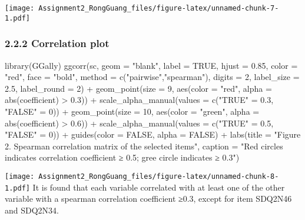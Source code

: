 \documentclass[
]{article}
\newenvironment{Shaded}{\begin{snugshade}}{\end{snugshade}}
\newcommand{\AttributeTok}[1]{\textcolor[rgb]{0.77,0.63,0.00}{#1}}
\newcommand{\ConstantTok}[1]{\textcolor[rgb]{0.00,0.00,0.00}{#1}}
\newcommand{\DecValTok}[1]{\textcolor[rgb]{0.00,0.00,0.81}{#1}}
\newcommand{\FloatTok}[1]{\textcolor[rgb]{0.00,0.00,0.81}{#1}}
\newcommand{\FunctionTok}[1]{\textcolor[rgb]{0.00,0.00,0.00}{#1}}
\newcommand{\NormalTok}[1]{#1}
\newcommand{\OtherTok}[1]{\textcolor[rgb]{0.56,0.35,0.01}{#1}}
\newcommand{\SpecialCharTok}[1]{\textcolor[rgb]{0.00,0.00,0.00}{#1}}
\newcommand{\StringTok}[1]{\textcolor[rgb]{0.31,0.60,0.02}{#1}}
\begin{document}
\texttt{[image: Assignment2\_RongGuang\_files/figure-latex/unnamed-chunk-7-1.pdf]}

\hypertarget{correlation-plot}{%
\subsubsection{2.2.2 Correlation plot}\label{correlation-plot}}

\begin{Shaded}
\begin{Highlighting}[]
\FunctionTok{library}\NormalTok{(GGally)}
\FunctionTok{ggcorr}\NormalTok{(sc, }
       \AttributeTok{geom =} \StringTok{"blank"}\NormalTok{, }
       \AttributeTok{label =} \ConstantTok{TRUE}\NormalTok{, }
       \AttributeTok{hjust =} \FloatTok{0.85}\NormalTok{, }
       \AttributeTok{color =} \StringTok{"red"}\NormalTok{, }
       \AttributeTok{face =} \StringTok{"bold"}\NormalTok{, }
       \AttributeTok{method =} \FunctionTok{c}\NormalTok{(}\StringTok{"pairwise"}\NormalTok{,}\StringTok{"spearman"}\NormalTok{),}
       \AttributeTok{digits =} \DecValTok{2}\NormalTok{,}
       \AttributeTok{label\_size =} \FloatTok{2.5}\NormalTok{,}
       \AttributeTok{label\_round =} \DecValTok{2}\NormalTok{) }\SpecialCharTok{+}
  \FunctionTok{geom\_point}\NormalTok{(}\AttributeTok{size =} \DecValTok{9}\NormalTok{, }
             \FunctionTok{aes}\NormalTok{(}\AttributeTok{color =} \StringTok{"red"}\NormalTok{, }
                 \AttributeTok{alpha =} \FunctionTok{abs}\NormalTok{(coefficient) }\SpecialCharTok{\textgreater{}} \FloatTok{0.3}\NormalTok{)) }\SpecialCharTok{+}
  \FunctionTok{scale\_alpha\_manual}\NormalTok{(}\AttributeTok{values =} \FunctionTok{c}\NormalTok{(}\StringTok{"TRUE"} \OtherTok{=} \FloatTok{0.3}\NormalTok{, }\StringTok{"FALSE"} \OtherTok{=} \DecValTok{0}\NormalTok{)) }\SpecialCharTok{+}
    \FunctionTok{geom\_point}\NormalTok{(}\AttributeTok{size =} \DecValTok{10}\NormalTok{, }
               \FunctionTok{aes}\NormalTok{(}\AttributeTok{color =} \StringTok{"green"}\NormalTok{, }\AttributeTok{alpha =} \FunctionTok{abs}\NormalTok{(coefficient) }\SpecialCharTok{\textgreater{}} \FloatTok{0.6}\NormalTok{)) }\SpecialCharTok{+}
  \FunctionTok{scale\_alpha\_manual}\NormalTok{(}\AttributeTok{values =} \FunctionTok{c}\NormalTok{(}\StringTok{"TRUE"} \OtherTok{=} \FloatTok{0.5}\NormalTok{, }\StringTok{"FALSE"} \OtherTok{=} \DecValTok{0}\NormalTok{)) }\SpecialCharTok{+}
  \FunctionTok{guides}\NormalTok{(}\AttributeTok{color =} \ConstantTok{FALSE}\NormalTok{, }
         \AttributeTok{alpha =} \ConstantTok{FALSE}\NormalTok{) }\SpecialCharTok{+}
  \FunctionTok{labs}\NormalTok{(}\AttributeTok{title =} \StringTok{"Figure 2. Spearman correlation matrix of the selected items"}\NormalTok{,}
       \AttributeTok{caption =} 
         \StringTok{"Red circles indicates correlation coefficient ≥ 0.5; gree circle indicates ≥ 0.3"}\NormalTok{)}
\end{Highlighting}
\end{Shaded}

\texttt{[image: Assignment2\_RongGuang\_files/figure-latex/unnamed-chunk-8-1.pdf]}
It is found that each variable correlated with at least one of the other
variable with a spearman correlation coefficient ≥0.3, except for item
SDQ2N46 and SDQ2N34.
\end{document}
